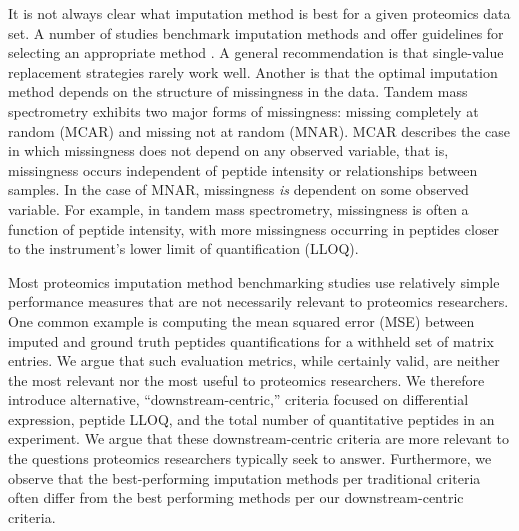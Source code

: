 \documentclass{article}
\begin{document}
It is not always clear what imputation method is best for a given proteomics data set. A number of studies benchmark imputation methods and offer guidelines for selecting an appropriate method \cite{Bramer:review, Webb-Robertson:review, DIMA, lazar, valikangas, dabke}. A general recommendation is that single-value replacement strategies rarely work well. Another is that the optimal imputation method depends on the structure of missingness in the data. Tandem mass spectrometry exhibits two major forms of missingness: missing completely at random (MCAR) and missing not at random (MNAR). MCAR describes the case in which missingness does not depend on any observed variable, that is, missingness occurs independent of peptide intensity or relationships between samples. In the case of MNAR, missingness \textit{is} dependent on some observed variable. For example, in tandem mass spectrometry, missingness is often a function of peptide intensity, with more missingness occurring in peptides closer to the instrument's lower limit of quantification (LLOQ). 

Most proteomics imputation method benchmarking studies use relatively simple performance measures that are not necessarily relevant to proteomics researchers. One common example is computing the mean squared error (MSE) between imputed and ground truth peptides quantifications for a withheld set of matrix entries. We argue that such evaluation metrics, while certainly valid, are neither the most relevant nor the most useful to proteomics researchers. We therefore introduce alternative, ``downstream-centric,'' criteria focused on differential expression, peptide LLOQ, and the total number of quantitative peptides in an experiment. We argue that these downstream-centric criteria are more relevant to the questions proteomics researchers typically seek to answer. Furthermore, we observe that the best-performing imputation methods per traditional criteria often differ from the best performing methods per our downstream-centric criteria. 
\end{document}
